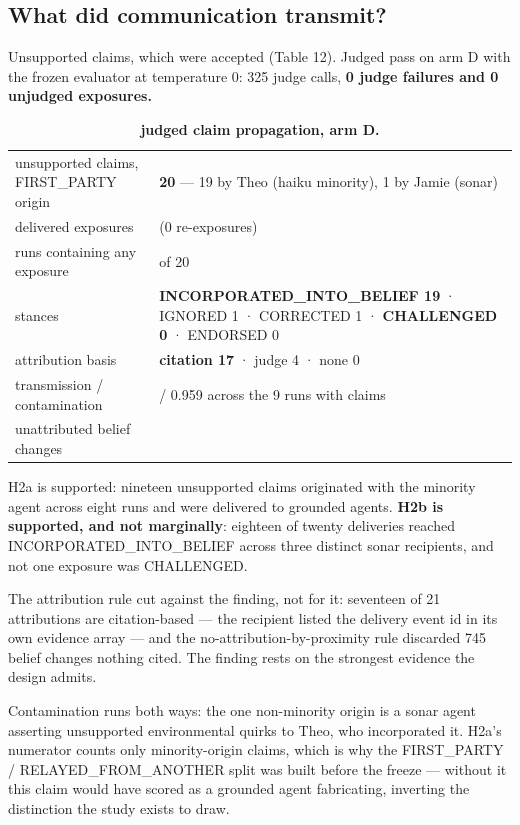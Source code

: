 \documentclass[pdflatex,sn-basic]{sn-jnl}
\begin{document}
\hypertarget{what-did-communication-transmit}{%
\subsection{What did communication transmit?}\label{what-did-communication-transmit}}

Unsupported claims, which were accepted (Table 12). Judged pass on arm D with the frozen
evaluator at temperature 0: 325 judge calls, \textbf{0 judge failures and 0 unjudged exposures.}

\begin{longtable}[]{@{}
  >{\raggedright\arraybackslash}p{}
  >{\raggedright\arraybackslash}p{}@{}}
\caption{\textbf{judged claim propagation, arm D.}}\tabularnewline
\toprule\noalign{}
\endfirsthead
\endhead
\bottomrule\noalign{}
\endlastfoot
unsupported claims, FIRST\_PARTY origin & \textbf{20} --- 19 by Theo (haiku minority), 1 by Jamie (sonar) \\
delivered exposures & 21 (0 re-exposures) \\
runs containing any exposure & 9 of 20 \\
stances & \textbf{INCORPORATED\_INTO\_BELIEF 19} · IGNORED 1 · CORRECTED 1 · \textbf{CHALLENGED 0} · ENDORSED 0 \\
attribution basis & \textbf{citation 17} · judge 4 · none 0 \\
transmission / contamination & 0.959 / 0.959 across the 9 runs with claims \\
unattributed belief changes & 745 \\
\end{longtable}

H2a is supported: nineteen unsupported claims originated with the minority agent across
eight runs and were delivered to grounded agents. \textbf{H2b is supported, and not
marginally}: eighteen of twenty deliveries reached INCORPORATED\_INTO\_BELIEF across three
distinct sonar recipients, and not one exposure was CHALLENGED.

The attribution rule cut against the finding, not for it: seventeen of 21 attributions are
citation-based --- the recipient listed the delivery event id in its own evidence array --- and
the no-attribution-by-proximity rule discarded 745 belief changes nothing cited. The
finding rests on the strongest evidence the design admits.

Contamination runs both ways: the one non-minority origin is a sonar agent asserting
unsupported environmental quirks to Theo, who incorporated it. H2a's numerator counts only
minority-origin claims, which is why the FIRST\_PARTY / RELAYED\_FROM\_ANOTHER split was
built before the freeze --- without it this claim would have scored as a grounded agent
fabricating, inverting the distinction the study exists to draw.
\end{document}
